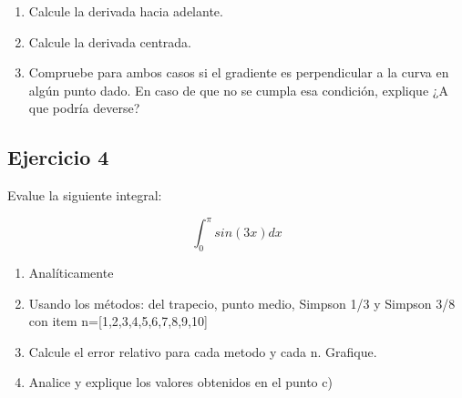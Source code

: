 \documentclass[a4paper,11pt]{article}
\theoremstyle{mytheor}
\begin{document}
\begin{enumerate}[label=\alph*)]
  \item Calcule la derivada hacia adelante.
  \item Calcule la derivada centrada.
  \item Compruebe para ambos casos si el gradiente es perpendicular a la curva en algún punto dado. En caso de que no se cumpla esa condición, explique ¿A que podría deverse?

\end{enumerate} 







\subsection*{Ejercicio 4} 

Evalue la siguiente integral:

\begin{equation*}
    \int_{0}^{\pi}sin(3x)dx
\end{equation*}

\begin{enumerate}[label=\alph*)]
    \item Analíticamente
    \item Usando los métodos: del trapecio, punto medio, Simpson 1/3 y Simpson 3/8 con item n=[1,2,3,4,5,6,7,8,9,10]
    \item Calcule el error relativo para cada metodo y cada n. Grafique.
    \item Analice y explique los valores obtenidos en el punto c)
\end{enumerate} 
\end{document}

